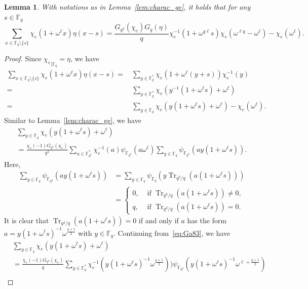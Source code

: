 \documentclass[10pt]{amsart}
\newtheorem{lemm}[theo]{Lemma}
\theoremstyle{definition}
\DeclareMathOperator{\Tr}{Tr}
\newcommand*\F{{\mathbb F}}
\begin{document}
\begin{lemm}\label{lem:charac28}
With notations as in Lemma~\ref{lem:charac_ge}, it holds that for any $s\in \F_q$
\[
\sum_{x\in \F_q\setminus \{s\}}\chi_{e}(1+\omega^\ell x)\eta(x-s)=\frac{G_{q^2}(\chi_e)G_q(\eta)}{q}\chi_e^{-1}(1+\omega^{q\ell}s)
\chi_e(\omega^{\ell q}-\omega^\ell)-\chi_e(\omega^\ell).
\]
\end{lemm}

\begin{proof}
Since ${\chi_e}_{|\F_q}=\eta$, we have
\begin{align}
\sum_{x\in \F_q\setminus \{s\}}\chi_e(1+\omega^\ell x)\eta(x-s)=&\, \sum_{y\in \F_q^\ast}\chi_e(1+\omega^\ell (y+s))\chi_e^{-1}(y)\nonumber\\
=&\, \sum_{y\in \F_q^\ast}\chi_e(y^{-1}(1+\omega^\ell s)+\omega^\ell)\nonumber\\
=&\, \sum_{y\in \F_q}\chi_{e}(y(1+\omega^\ell s)+\omega^\ell)-\chi_e(\omega^\ell). \label{eq:chara28}
\end{align}
Similar to Lemma~\ref{lem:charac_ge}, we have
\begin{multline}\label{eq:Ga83}
\sum_{y\in \F_q}\chi_e(y(1+\omega^\ell s)+\omega^\ell)\\=
\frac{\chi_e(-1)G_{q^2}(\chi_e)}{q^2}\sum_{a\in \F_{q^2}^\ast}\chi_e^{-1}(a)\psi_{\F_{q^2}}(a\omega^\ell)\sum_{y\in \F_q}\psi_{\F_{q^2}}(a y(1+\omega^\ell s)).
\end{multline}
Here,
\begin{align*}
\sum_{y\in \F_q}\psi_{\F_{q^2}}(a y(1+\omega^\ell s))&=
\sum_{y\in \F_q}\psi_{\F_q}(y\Tr_{q^2/q}(a (1+\omega^\ell s)))\\
&=
\begin{cases}
0,& \text{ if } \Tr_{q^2/q}(a (1+\omega^\ell s))\not=0,\\
q,& \text{ if } \Tr_{q^2/q}(a (1+\omega^\ell s))=0.
\end{cases}
\end{align*}
It is clear that $\Tr_{q^2/q}(a (1+\omega^\ell s))=0$ if and only if $a$ has the form $a=y (1+\omega^\ell s)^{-1}\omega^\frac{q+1}{2}$ with $y\in \F_q$. Continuing from~\eqref{eq:Ga83}, we have
\begin{align}
&\sum_{y\in \F_q}\chi_e(y(1+\omega^\ell s)+\omega^\ell)\nonumber\\
&=\frac{\chi_e(-1)G_{q^2}(\chi_e)}{q}\sum_{y\in \F_q^\ast}\chi_e^{-1}(y (1+\omega^\ell s)^{-1}\omega^\frac{q+1}{2}))\psi_{\F_{q^2}}(y (1+\omega^\ell s)^{-1}\omega^{\ell+\frac{q+1}{2}})\nonumber\\

\end{align}
\end{proof}
\end{document}
